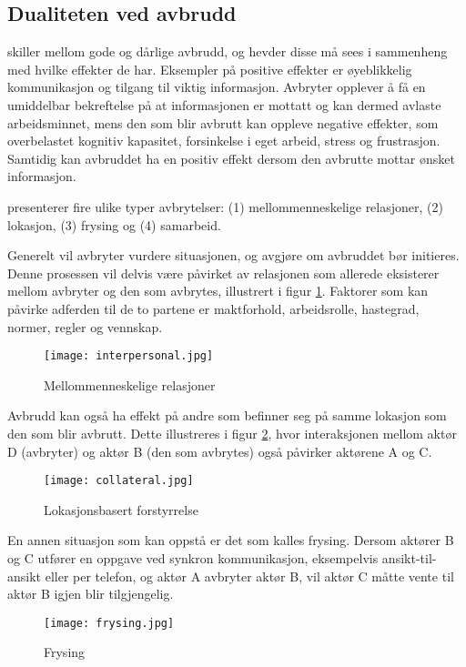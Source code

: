 \subsection{Dualiteten ved avbrudd}
\citet{Grundgeiger09} skiller mellom gode og dårlige avbrudd, og hevder disse må sees i sammenheng med hvilke effekter de har. Eksempler på positive effekter er øyeblikkelig kommunikasjon og tilgang til viktig informasjon. Avbryter opplever å få en umiddelbar bekreftelse på at informasjonen er mottatt og kan dermed avlaste arbeidsminnet, mens den som blir avbrutt kan oppleve negative effekter, som overbelastet kognitiv kapasitet, forsinkelse i eget arbeid, stress og frustrasjon. Samtidig kan avbruddet ha en positiv effekt dersom den avbrutte mottar ønsket informasjon.

\noindent
\citet{Harr07} presenterer fire ulike typer avbrytelser: (1) mellommenneskelige relasjoner, (2) lokasjon, (3) frysing og (4) samarbeid.

\noindent
Generelt vil avbryter vurdere situasjonen, og avgjøre om avbruddet bør initieres. Denne prosessen vil delvis være påvirket av relasjonen som allerede eksisterer mellom avbryter og den som avbrytes, illustrert i figur \ref{interpersonal}. Faktorer som kan påvirke adferden til de to partene er maktforhold, arbeidsrolle, hastegrad, normer, regler og vennskap. 
\begin{figure}[H]
\centering
\texttt{[image: interpersonal.jpg]}
\caption{Mellommenneskelige relasjoner}
\label{interpersonal}
\end{figure}

\noindent
Avbrudd kan også ha effekt på andre som befinner seg på samme lokasjon som den som blir avbrutt. Dette illustreres i figur \ref{collateral}, hvor interaksjonen mellom aktør D (avbryter) og aktør B (den som avbrytes) også påvirker aktørene A og C.
\begin{figure}[H]
\centering
\texttt{[image: collateral.jpg]}
\caption{Lokasjonsbasert forstyrrelse}
\label{collateral}
\end{figure}

\noindent
En annen situasjon som kan oppstå er det som kalles frysing. Dersom aktører B og C utfører en oppgave ved synkron kommunikasjon, eksempelvis ansikt-til-ansikt eller per telefon, og aktør A avbryter aktør B, vil aktør C måtte vente til aktør B igjen blir tilgjengelig. 
\begin{figure}[H]
\centering
\texttt{[image: frysing.jpg]}
\caption{Frysing}
\label{frysing}
\end{figure}

